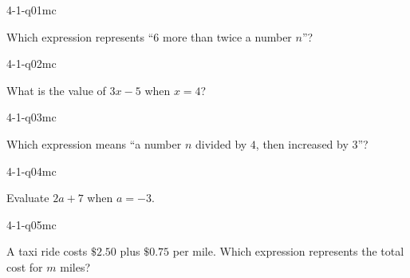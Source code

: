 

\begin{practiceQuestion}{4-1-q01}{mc}
\begin{questionText}
Which expression represents ``$6$ more than twice a number $n$''?
\end{questionText}
\end{practiceQuestion}

\begin{practiceQuestion}{4-1-q02}{mc}
\begin{questionText}
What is the value of $3x - 5$ when $x = 4$?
\end{questionText}
\end{practiceQuestion}

\begin{practiceQuestion}{4-1-q03}{mc}
\begin{questionText}
Which expression means ``a number $n$ divided by $4$, then increased by $3$''?
\end{questionText}
\end{practiceQuestion}

\begin{practiceQuestion}{4-1-q04}{mc}
\begin{questionText}
Evaluate $2a + 7$ when $a = -3$.
\end{questionText}
\end{practiceQuestion}

\begin{practiceQuestion}{4-1-q05}{mc}
\begin{questionText}
A taxi ride costs $\$2.50$ plus $\$0.75$ per mile. Which expression represents the total cost for $m$ miles?
\end{questionText}
\end{practiceQuestion}

